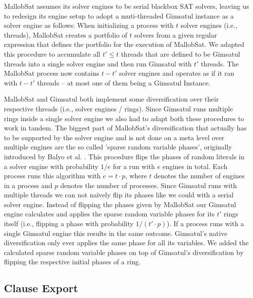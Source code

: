 \documentclass[12pt,a4paper,twoside]{scrartcl}
\numberwithin{equation}{section}
\begin{document}
MallobSat assumes its solver engines to be serial blackbox SAT solvers, leaving us to redesign its engine setup to adopt a muti-threaded Gimsatul instance as a solver engine as follows: 
When initializing a process with $t$ solver engines (i.e., threads), MallobSat creates a portfolio of $t$ solvers from a given regular expression that defines the portfolio for the execution of MallobSat. We adapted this procedure to accumulate all $t' \leq t$ threads that are defined to be Gimsatul threads into a single solver engine and then run Gimsatul with $t'$ threads. The MallobSat process now contains $t - t'$ solver engines and operates as if it ran with $t - t'$ threads -- at most one of them being a Gimsatul Instance.

MallobSat and Gimsatul both implement some diversification over their respective threads (i.e., solver engines / rings). Since Gimsatul runs multiple rings inside a single solver engine we also had to adapt both these procedures to work in tandem.
The biggest part of MallobSat's diversification that actually has to be supported by the solver engine and is not done on a meta level over multiple engines are the so called 'sparse random variable phases', originally introduced by Balyo et al. \cite{hordeSat}. This procedure flips the phases of random literals in a solver engine with probability $1 / e$ for a run with $e$ engines in total. Each process runs this algorithm with $e = t \cdot p$, where $t$ denotes the number of engines in a process and $p$ denotes the number of processes. Since Gimsatul runs with multiple threads we can not na\"ively flip its phases like we could with a serial solver engine. Instead of flipping the phases given by MallobSat our Gimsatul engine calculates and applies the sparse random variable phases for its $t'$ rings itself (i.e., flipping a phase with probability $1 / (t' \cdot p)$). If a process runs with a single Gimsatul engine this results in the same outcome.
Gimsatul's native diversification only ever applies the same phase for all its variables. We added the calculated sparse random variable phases on top of Gimsatul's diversification by flipping the respective initial phases of a ring.

\subsection{Clause Export}
\end{document}
